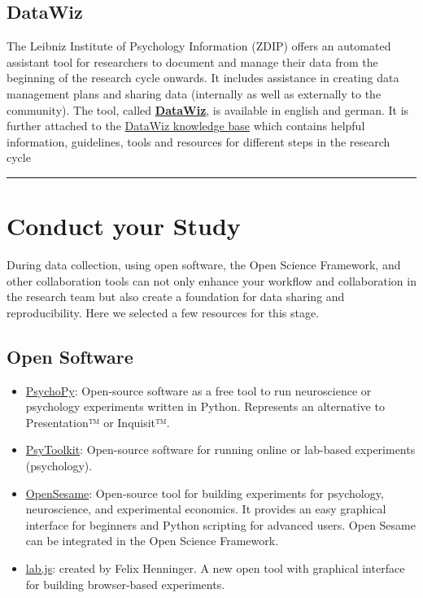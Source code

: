 \documentclass[12pt,]{report}
\providecommand{\tightlist}{%
  \setlength{\itemsep}{0pt}\setlength{\parskip}{0pt}}
\begin{document}
\subsection{DataWiz}\label{datawiz}

The Leibniz Institute of Psychology Information (ZDIP) offers an
automated assistant tool for researchers to document and manage their
data from the beginning of the research cycle onwards. It includes
assistance in creating data management plans and sharing data
(internally as well as externally to the community). The tool, called
\href{https://datawiz.leibniz-psychology.org/DataWiz/}{\textbf{DataWiz}},
is available in english and german. It is further attached to the
\href{https://datawizkb.leibniz-psychology.org/}{DataWiz knowledge base}
which contains helpful information, guidelines, tools and resources for
different steps in the research cycle

\begin{center}\rule{0.5\linewidth}{\linethickness}\end{center}

\hypertarget{conduct}{\section{Conduct your Study}\label{conduct}}

During data collection, using open software, the Open Science Framework,
and other collaboration tools can not only enhance your workflow and
collaboration in the research team but also create a foundation for data
sharing and reproducibility. Here we selected a few resources for this
stage.

\subsection{Open Software}\label{open-software}

\begin{itemize}
\tightlist
\item
  \href{http://www.psychopy.org/}{PsychoPy}: Open-source software as a
  free tool to run neuroscience or psychology experiments written in
  Python. Represents an alternative to Presentation™ or Inquisit™.
\item
  \href{https://www.psytoolkit.org/}{PsyToolkit}: Open-source software
  for running online or lab-based experiments (psychology).
\item
  \href{http://osdoc.cogsci.nl/}{OpenSesame}: Open-source tool for
  building experiments for psychology, neuroscience, and experimental
  economics. It provides an easy graphical interface for beginners and
  Python scripting for advanced users. Open Sesame can be integrated in
  the Open Science Framework.
\item
  \href{https://labjs.felixhenninger.com/}{lab.js}: created by Felix
  Henninger. A new open tool with graphical interface for building
  browser-based experiments.
\end{itemize}
\end{document}
